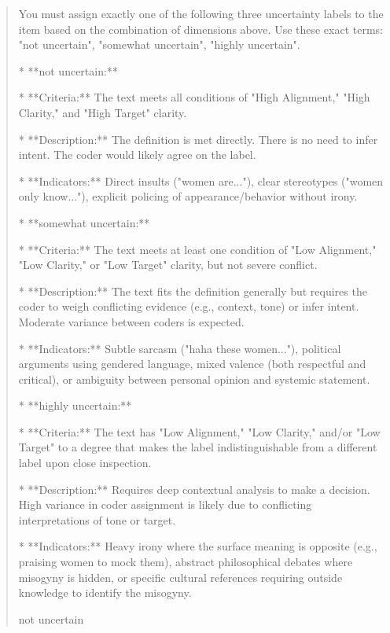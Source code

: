 \begin{quote}
You must assign exactly one of the following three uncertainty labels to the item based on the combination of dimensions above. Use these exact terms: "not uncertain", "somewhat uncertain", "highly uncertain".



*   **not uncertain:**

    *   **Criteria:** The text meets all conditions of "High Alignment," "High Clarity," and "High Target" clarity.

    *   **Description:** The definition is met directly. There is no need to infer intent. The coder would likely agree on the label.

    *   **Indicators:** Direct insults ("women are..."), clear stereotypes ("women only know..."), explicit policing of appearance/behavior without irony.



*   **somewhat uncertain:**

    *   **Criteria:** The text meets at least one condition of "Low Alignment," "Low Clarity," or "Low Target" clarity, but not severe conflict.

    *   **Description:** The text fits the definition generally but requires the coder to weigh conflicting evidence (e.g., context, tone) or infer intent. Moderate variance between coders is expected.

    *   **Indicators:** Subtle sarcasm ("haha these women..."), political arguments using gendered language, mixed valence (both respectful and critical), or ambiguity between personal opinion and systemic statement.



*   **highly uncertain:**

    *   **Criteria:** The text has "Low Alignment," "Low Clarity," and/or "Low Target" to a degree that makes the label indistinguishable from a different label upon close inspection.

    *   **Description:** Requires deep contextual analysis to make a decision. High variance in coder assignment is likely due to conflicting interpretations of tone or target.

    *   **Indicators:** Heavy irony where the surface meaning is opposite (e.g., praising women to mock them), abstract philosophical debates where misogyny is hidden, or specific cultural references requiring outside knowledge to identify the misogyny.



not uncertain
\end{quote}
